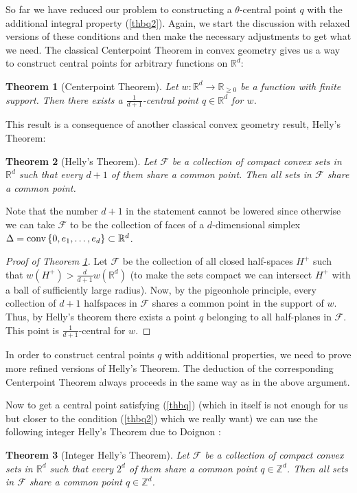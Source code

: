 \documentclass{daj}
\renewcommand{\ge}{\geqslant}
\newcommand{\R}{\mathbb R}
\newcommand{\Z}{\mathbb Z}
\newcommand{\conv}{{\rm conv}\,}
\newcommand{\F}{\mathcal F}
\newtheorem{theorem}{Theorem}[section]
\theoremstyle{definition}
\theoremstyle{remark}
\theoremstyle{definition}
\theoremstyle{definition}
\begin{document}
So far we have reduced our problem to constructing a $\theta$-central point $q$ with the additional integral property (\ref{thbq2}). Again, we start the discussion with relaxed versions of these conditions and then make the necessary adjustments to get what we need. The classical Centerpoint Theorem in convex geometry gives us a way to construct central points for arbitrary functions on $\R^d$:
\begin{theorem}[Centerpoint Theorem]\label{centerb}
    Let $w:\R^d \rightarrow \R_{\ge 0}$ be a function with finite support. Then there exists a $\frac{1}{d+1}$-central point $q \in \R^d$ for $w$.
\end{theorem}

This result is a consequence of another classical convex geometry result, Helly's Theorem:
\begin{theorem}[Helly's Theorem]\label{hell}
    Let $\F$ be a collection of compact convex sets in $\R^d$ such that every $d+1$ of them share a common point. Then all sets in $\F$ share a common point.
\end{theorem}

Note that the number $d+1$ in the statement cannot be lowered since otherwise we can take $\F$ to be the collection of faces of a $d$-dimensional simplex $\Delta = \conv\{0, e_1, \ldots, e_d\} \subset \R^d$.

\begin{proof}[Proof of Theorem \ref{centerb}]
    Let $\F$ be the collection of all closed half-spaces $H^+$ such that $w(H^+) > \frac{d}{d+1} w(\R^d)$ (to make the sets compact we can intersect $H^+$ with a ball of sufficiently large radius). Now, by the pigeonhole principle, every collection of $d+1$ halfspaces in $\F$ shares a common point in the support of $w$. Thus, by Helly's theorem there exists a point $q$ belonging to all half-planes in $\F$. This point is $\frac{1}{d+1}$-central for $w$.
\end{proof}

In order to construct central points $q$ with additional properties, we need to prove more refined versions of Helly's Theorem. The deduction of the corresponding Centerpoint Theorem always proceeds in the same way as in the above argument.

Now to get a central point satisfying (\ref{thbq}) (which in itself is not enough for us but closer to the condition (\ref{thbq2}) which we really want) we can use the following integer Helly's Theorem due to Doignon \cite{D}:
\begin{theorem}[Integer Helly's Theorem]\label{inthell}
    Let $\F$ be a collection of compact convex sets in $\R^d$ such that every $2^d$ of them share a common point $q\in \Z^d$. Then all sets in $\F$ share a common point $q \in \Z^d$.
\end{theorem}
\end{document}
